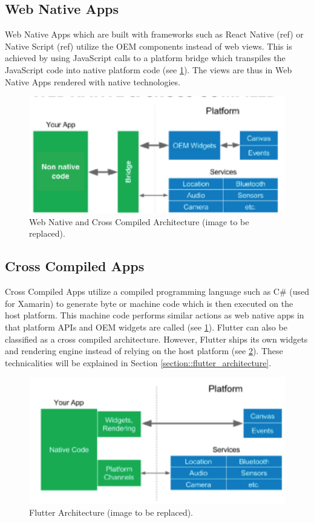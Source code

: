 \subsection{Web Native Apps}
Web Native Apps which are built with frameworks such as React Native (ref) or Native Script (ref) utilize the OEM components instead of web views.
This is achieved by using JavaScript calls to a platform bridge which transpiles the JavaScript code into native platform code (see \ref{fig:web_native_architecture}). 
The views are thus in Web Native Apps rendered with native technologies.

\begin{figure}
    \includegraphics[width=\linewidth]{images/architectures/native_web_app_architecture.png}
    \caption{Web Native and Cross Compiled Architecture (image to be replaced).}
    \label{fig:web_native_architecture}
\end{figure}

\subsection{Cross Compiled Apps}
Cross Compiled Apps utilize a compiled programming language such as C\# (used for Xamarin) to generate byte or machine code which is then executed 
on the host platform. This machine code performs similar actions as web native apps in that platform APIs and OEM widgets are called (see \ref{fig:web_native_architecture}).
Flutter can also be classified as a cross compiled architecture. However, Flutter ships its own widgets and rendering engine instead of relying on
the host platform (see \ref{fig:flutter_architecture}). These technicalities will be explained in Section \ref{section::flutter_architecture}.

\begin{figure}
    \includegraphics[width=\linewidth]{images/architectures/flutter_architecture.png}
    \caption{Flutter Architecture (image to be replaced).}
    \label{fig:flutter_architecture}
\end{figure}

